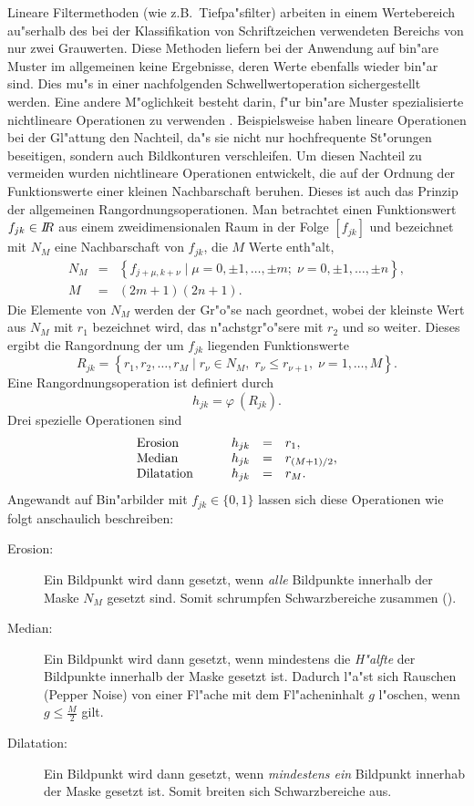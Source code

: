 Lineare Filtermethoden (wie z.B.\ Tiefpa"sfilter) arbeiten in einem Wertebereich
au"serhalb des bei der Klassifikation von Schriftzeichen verwendeten Bereichs von
nur zwei Grauwerten. Diese Methoden liefern bei der Anwendung auf bin"are Muster
im allgemeinen keine Ergebnisse, deren Werte ebenfalls wieder bin"ar sind. Dies mu"s
in einer nachfolgenden Schwellwertoperation sichergestellt werden. Eine andere
M"oglichkeit besteht darin, f"ur bin"are Muster spezialisierte nichtlineare Operationen
zu verwenden \cite{Niemann83}. Beispielsweise haben lineare Operationen bei der Gl"attung
den Nachteil, da"s sie nicht nur hochfrequente St"orungen beseitigen, sondern auch 
Bildkonturen verschleifen. Um diesen Nachteil zu vermeiden wurden nichtlineare Operationen
entwickelt, die auf der Ordnung der Funktionswerte einer kleinen Nachbarschaft beruhen.
Dieses ist auch das Prinzip der allgemeinen Rangordnungsoperationen. 
Man betrachtet einen Funktionswert
$f_{jk} \in \hbox{$I\kern -0.275em R$}$ aus einem zweidimensionalen Raum in der Folge $[f_{jk}]$ und 
bezeichnet mit $N_M$ eine Nachbarschaft von $f_{jk}$, die $M$ Werte enth"alt,
\begin{eqnarray*}
N_M &=& \left\{ f_{j+\mu, k+\nu} \;|\; \mu = 0, \pm 1,\ldots, \pm m;\; \nu = 0, \pm 1, \ldots, \pm n \right\},\\
M   &=& (2m + 1)(2n + 1).
\end{eqnarray*}
Die Elemente von $N_M$ werden der Gr"o"se nach geordnet, wobei der kleinste Wert aus $N_M$
mit $r_1$ bezeichnet wird, das n"achstgr"o"sere mit $r_2$ und so weiter. Dieses ergibt die
Rangordnung der um $f_{jk}$ liegenden Funktionswerte
$$R_{jk} = \left\{ r_1, r_2, \ldots, r_M \;|\; r_\nu \in N_M,\;r_\nu \le r_{\nu+1},\;\nu = 1,\ldots,M \right\}.$$
Eine Rangordnungsoperation ist definiert durch 
$$h_{jk} = \varphi\:(R_{jk}).$$
Drei spezielle Operationen sind
\[ \begin{array}{llcl}
\mbox{Erosion}          & h_{jk} &=& r_1,\\
\mbox{Median}           & h_{jk} &=& r_{(M + 1) / 2},\\
\mbox{Dilatation\qquad} & h_{jk} &=& r_M.
\end{array} \]
Angewandt auf Bin"arbilder mit $f_{jk} \in \{ 0, 1 \}$ lassen sich diese Operationen wie folgt anschaulich beschreiben:
\begin{description}
  \item[Erosion:] Ein Bildpunkt wird dann gesetzt, wenn {\em alle} Bildpunkte innerhalb 
  der Maske $N_M$
  gesetzt sind. Somit schrumpfen Schwarzbereiche zusammen ().
  \item[Median:]  Ein Bildpunkt wird dann gesetzt, wenn mindestens die {\em H"alfte} der Bildpunkte 
  innerhalb der Maske gesetzt ist. Dadurch l"a"st sich Rauschen (Pepper Noise) von einer
  Fl"ache mit dem Fl"acheninhalt $g$ l"oschen, wenn $g \le \frac{M}{2}$ gilt.
  \item[Dilatation:] Ein Bildpunkt wird dann gesetzt, wenn {\em mindestens ein} Bildpunkt 
  innerhab der Maske gesetzt ist. Somit breiten sich Schwarzbereiche aus.
\end{description}

